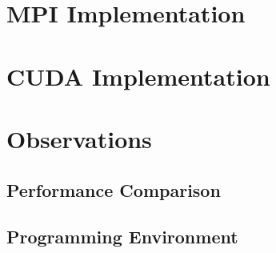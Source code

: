 \documentclass{article}
\begin{document}
\section{MPI Implementation}

\section{CUDA Implementation}

\section{Observations}

\subsection{Performance Comparison}

\subsection{Programming Environment}

%
%
\end{document}
